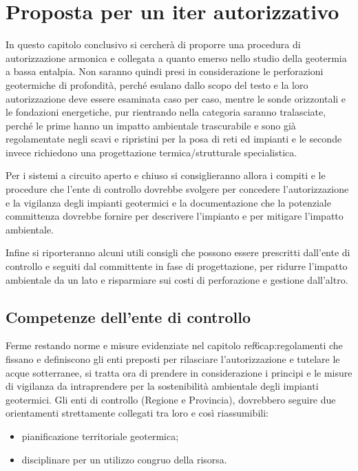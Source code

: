 \chapter{Proposta per un iter autorizzativo} %

\begin{preamble}
In questo capitolo conclusivo si cercherà di proporre una procedura di autorizzazione armonica e collegata a quanto emerso nello studio della geotermia a bassa entalpia. Non saranno quindi presi in considerazione le perforazioni geotermiche di profondità, perché esulano dallo scopo del testo e la loro autorizzazione deve essere esaminata caso per caso, mentre le sonde orizzontali e le fondazioni energetiche, pur rientrando nella categoria saranno tralasciate, perché le prime hanno un impatto ambientale trascurabile e sono già regolamentate negli scavi e ripristini per la posa di reti ed impianti e le seconde invece richiedono una progettazione termica/strutturale specialistica.

Per i sistemi a circuito aperto e chiuso si consiglieranno allora i compiti e le procedure che l'ente di controllo dovrebbe svolgere per concedere l'autorizzazione e la vigilanza degli impianti geotermici e la documentazione che la potenziale committenza dovrebbe fornire per descrivere l'impianto e per mitigare l'impatto ambientale.

Infine si riporteranno alcuni utili consigli che possono essere prescritti dall'ente di controllo e seguiti dal committente in fase di progettazione, per ridurre l'impatto ambientale da un lato e risparmiare sui costi di perforazione e gestione dall'altro.
\end{preamble}

\section{Competenze dell'ente di controllo}
Ferme restando norme e misure evidenziate nel capitolo ref{6cap:regolamenti} che fissano e definiscono gli enti preposti per rilasciare l'autorizzazione e tutelare le acque sotterranee, si tratta ora di prendere in considerazione i principi e le misure di vigilanza da intraprendere per la sostenibilità ambientale degli impianti geotermici. Gli enti di controllo (Regione e Provincia), dovrebbero seguire due orientamenti strettamente collegati tra loro e così riassumibili:
\begin{itemize}
\item pianificazione territoriale geotermica;
\item disciplinare per un utilizzo congruo della risorsa.
\end{itemize}

